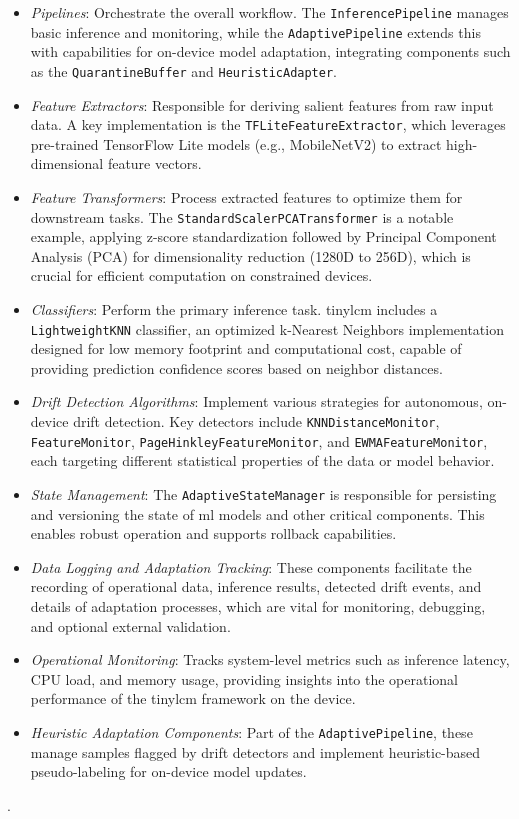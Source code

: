 \begin{itemize}
    \item \textit{Pipelines}: Orchestrate the overall workflow. The \texttt{InferencePipeline} manages basic inference and monitoring, while the \texttt{AdaptivePipeline} extends this with capabilities for on-device model adaptation, integrating components such as the \texttt{QuarantineBuffer} and \texttt{HeuristicAdapter}.
    \item \textit{Feature Extractors}: Responsible for deriving salient features from raw input data. A key implementation is the \texttt{TFLiteFeatureExtractor}, which leverages pre-trained TensorFlow Lite models (e.g., MobileNetV2) to extract high-dimensional feature vectors.
    \item \textit{Feature Transformers}: Process extracted features to optimize them for downstream tasks. The \texttt{StandardScalerPCATransformer} is a notable example, applying z-score standardization followed by Principal Component Analysis (PCA) for dimensionality reduction (1280D to 256D), which is crucial for efficient computation on constrained devices.
    \item \textit{Classifiers}: Perform the primary inference task. \gls{tinylcm} includes a \texttt{LightweightKNN} classifier, an optimized k-Nearest Neighbors implementation designed for low memory footprint and computational cost, capable of providing prediction confidence scores based on neighbor distances.
    \item \textit{Drift Detection Algorithms}: Implement various strategies for autonomous, on-device drift detection. Key detectors include \texttt{KNNDistanceMonitor}, \texttt{FeatureMonitor}, \texttt{PageHinkleyFeatureMonitor}, and \texttt{EWMAFeatureMonitor}, each targeting different statistical properties of the data or model behavior.
    \item \textit{State Management}: The \texttt{AdaptiveStateManager} is responsible for persisting and versioning the state of \gls{ml} models and other critical components. This enables robust operation and supports rollback capabilities.
    \item \textit{Data Logging and Adaptation Tracking}: These components facilitate the recording of operational data, inference results, detected drift events, and details of adaptation processes, which are vital for monitoring, debugging, and optional external validation.
    \item \textit{Operational Monitoring}: Tracks system-level metrics such as inference latency, CPU load, and memory usage, providing insights into the operational performance of the \gls{tinylcm} framework on the device.
    \item \textit{Heuristic Adaptation Components}: Part of the \texttt{AdaptivePipeline}, these manage samples flagged by drift detectors and implement heuristic-based pseudo-labeling for on-device model updates.
\end{itemize}.

